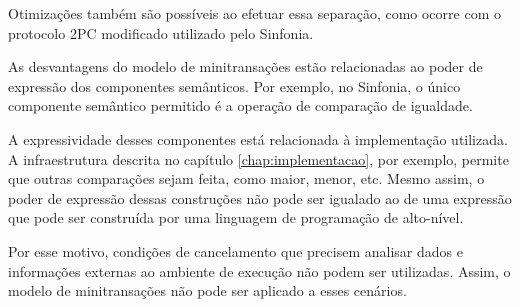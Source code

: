 \documentclass[11pt,twoside,a4paper]{book}
\begin{document}
Otimizações também são possíveis ao efetuar essa separação, como ocorre com o protocolo 2PC modificado utilizado pelo Sinfonia. 

As desvantagens do modelo de minitransações estão relacionadas ao poder de expressão dos componentes semânticos. Por exemplo, no Sinfonia, o único componente semântico permitido é a operação de comparação de igualdade.

A expressividade desses componentes está relacionada à implementação utilizada. A infraestrutura descrita no capítulo \ref{chap:implementacao}, por exemplo, permite que outras comparações sejam feita, como maior, menor, etc. Mesmo assim, o poder de expressão dessas construções não pode ser igualado ao de uma expressão que pode ser construída por uma linguagem de programação de alto-nível.

Por esse motivo, condições de cancelamento que precisem analisar dados e informações externas ao ambiente de execução não podem ser utilizadas. Assim, o modelo de minitransações não pode ser aplicado a esses cenários.







\end{document}

